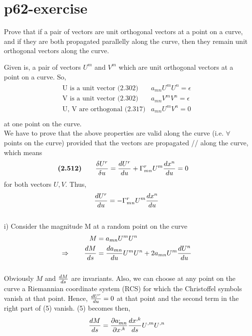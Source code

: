 \section{p62-exercise}
\begin{tcolorbox}
Prove that if a pair of vectors are unit orthogonal vectors at a point on a curve, and if they are both propagated parallelly along the curve, then they remain unit orthogonal vectors along the curve.
\end{tcolorbox}
Given is, a pair of vectors $U^m$ and $V^m$ which are unit orthogonal vectors at a point on a curve. So,
\begin{align}
\begin{array}{cc}
\text{U is a unit vector (2.302)}& a_{mn}U^m U^n = \epsilon\\
\text{V is a unit vector (2.302)}& a_{mn}V^m V^n = \epsilon\\
\text{U, V are orthogonal (2.317)}& a_{mn}U^m V^n = 0\\
\end{array}
\end{align}
at one point on the curve.\\
We have to prove that the above properties are valid along the curve (i.e. $\forall$ points on the curve) provided that the vectors are propagated // along the curve, which means
\begin{align}
\textbf{(2.512)}\quad\quad \frac{\delta U^r}{\delta u} &= \dv{U^r}{u} + \Gamma^r_{mn}U^m \dv{x^n}{u} = 0
\end{align}
for both vectors $U, V$. Thus,
\begin{align}
\dv{U^r}{u} = - \Gamma^r_{mn}U^m \dv{x^n}{u}
\end{align}\\
i) Consider the magnitude M at a random point on the curve
\begin{align}
\ M &= a_{mn}U^m U^n \\
\Rightarrow \quad\quad \dv{M}{s} &= \dv{a_{mn}}{u}U^m U^n + 2a_{mn}U^m \dv{U^n}{u} 
\end{align}\\
Obviously $M$ and $\dv{M}{s}$ are invariants. Also, we can choose at any point on the curve a Riemannian coordinate system (RCS) for which the Christoffel symbols vanish at that point. Hence, $\dv{U^r}{u} = 0 $ at that point and the second term in the right part of (5) vanish. (5) becomes then,
\begin{align}
 \dv{M}{s} = \pdv{a^,_{mn}}{x^{,k}}\dv{x^{,k}}{s}U^{,m} U^{,n}  
\end{align}
